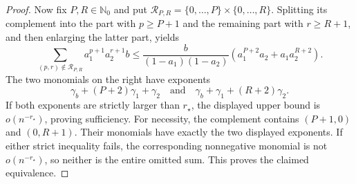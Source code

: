 \documentclass{article}
\begin{document}
\begin{proof}
Now fix \(P,R\in\mathbb N_0\) and put \(\mathcal R_{P,R}=\{0,\ldots,P\}\times\{0,\ldots,R\}\). Splitting its complement into the part with \(p\ge P+1\) and the remaining part with \(r\ge R+1\), and then enlarging the latter part, yields
\[
\sum_{(p,r)\notin\mathcal R_{P,R}}a_1^{p+1}a_2^{r+1}b
\le \frac{b}{(1-a_1)(1-a_2)}
\left(a_1^{P+2}a_2+a_1a_2^{R+2}\right).
\]
The two monomials on the right have exponents
\[
\gamma_b+(P+2)\gamma_1+\gamma_2
\quad\text{and}\quad
\gamma_b+\gamma_1+(R+2)\gamma_2.
\]
If both exponents are strictly larger than \(r_\star\), the displayed upper bound is \(o(n^{-r_\star})\), proving sufficiency. For necessity, the complement contains \((P+1,0)\) and \((0,R+1)\). Their monomials have exactly the two displayed exponents. If either strict inequality fails, the corresponding nonnegative monomial is not \(o(n^{-r_\star})\), so neither is the entire omitted sum. This proves the claimed equivalence.
\end{proof}
\end{document}
